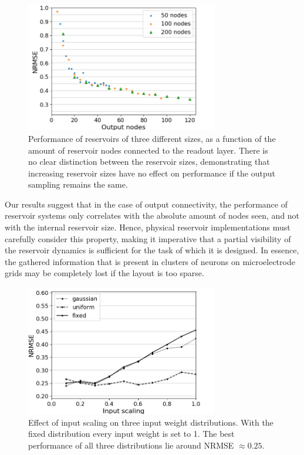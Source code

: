 \begin{figure}[t!]
  \centering
  \includegraphics[width=3.3in]{img/output_nodes.png}
  \caption{
    Performance of reservoirs of three different sizes, as a function of the
amount of reservoir nodes connected to the readout layer. There is no clear
distinction between the reservoir sizes, demonstrating that increasing reservoir
sizes have no effect on performance if the output sampling remains the same.
  }
  \label{output_nodes}
\end{figure}

Our results suggest that in the case of output connectivity, the performance of
reservoir systems only correlates with the absolute amount of nodes seen, and
not with the internal reservoir size. Hence, physical reservoir implementations
must carefully consider this property, making it imperative that a partial
visibility of the reservoir dynamics is sufficient for the task of which it is
designed. In essence, the gathered information that is present in clusters of
neurons on microelectrode grids may be completely lost if the layout is too
sparse.

\begin{figure}[t!]
  \centering
  \includegraphics[width=3.3in]{img/input_scaling_distrib.png}
  \caption{
    Effect of input scaling on three input weight distributions. With the fixed
distribution every input weight is set to 1. The best performance of all three
distributions lie around NRMSE $\approx 0.25$.
  }
  \label{input_scaling_distrib}
\end{figure}

